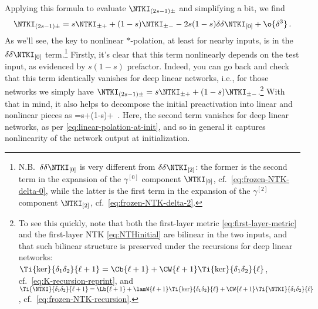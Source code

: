 Applying this formula to evaluate $\NTKI_{(2s-1)\pm}$ and simplifying a bit, we find
\begin{align}\label{eq:test-train-frozen-ntk-polation}
\NTKI_{(2s-1)\pm}=s \NTKI_{\pm+}+(1-s)\NTKI_{\pm-}-2s(1-s)\delta\delta\NTKI_{[0]}+\o{\delta^3}\, .
\end{align}
As we'll see, the key to nonlinear $\ast$-polation, at least for nearby inputs, is in the $\delta\delta\NTKI_{[0]}$ term.\footnote{N.B.~$\delta\delta\NTKI_{[0]}$ is very different from $\delta\delta\NTKI_{[2]}$: the former is the second term in the expansion of the $\gamma^{[0]}$ component  $\NTKI_{[0]}$, cf.~\eqref{eq:frozen-NTK-delta-0}, while the latter is the first term in the expansion of the $\gamma^{[2]}$ component $\NTKI_{[2]}$, cf.~\eqref{eq:frozen-NTK-delta-2}.}
Firstly, it's clear that this term nonlinearly depends on the test input, as evidenced by $s(1-s)$ prefactor.
Indeed, you can go back and check that this term identically vanishes for deep linear networks, i.e., for those networks we simply have $\NTKI_{(2s-1)\pm}=s \NTKI_{\pm+}+(1-s)\NTKI_{\pm-}$.\footnote{To see this quickly, note that both the first-layer metric \eqref{eq:first-layer-metric} and the first-layer NTK \eqref{eq:NTHinitial} are bilinear in the two inputs, and that such bilinear structure is preserved under the recursions for deep linear networks: $\Ti{\ker}{\delta_1\delta_2}{\ell+1}=\Cb{\ell+1} + \CW{\ell+1}\Ti{\ker}{\delta_1\delta_2}{\ell}$,
cf.~\eqref{eq:K-recursion-reprint},
and $ \Ti{\NTKI}{\delta_1\delta_2}{\ell+1}=\Lb{\ell+1} + \lamW{\ell+1}\Ti{\ker}{\delta_1\delta_2}{\ell}+\CW{\ell+1}\Ti{\NTKI}{\delta_1\delta_2}{\ell}$,
cf.~\eqref{eq:frozen-NTK-recursion}.} With that in mind, it also helps to decompose the initial preactivation into linear and nonlinear pieces as
\be\label{eq:init-preactivation-decomposition-for-polation}
=s+(1-s)+\le[\z{i}{(2s-1)}{L}-s\z{i}{+}{L}-(1-s)\z{i}{-}{L}\ri]\, .
\ee
Here, the second term vanishes for deep linear networks, as per \eqref{eq:linear-polation-at-init}, and so in general it captures nonlinearity of the network output at initialization.



